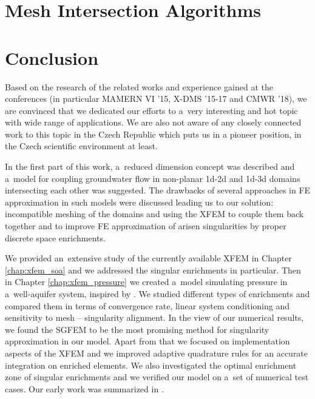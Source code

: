\documentclass[bibliography=totocnumbered,dvipsnames,FM,Dis,EN]{tulthesis}
\begin{document}

\chapter{Mesh Intersection Algorithms} \label{chap:intersections}







\chapter{Conclusion} \label{chap:summary}


Based on the research of the related works and experience gained at the conferences
(in particular MAMERN VI '15, X-DMS '15-17 and CMWR '18),
we are convinced that we dedicated our efforts to a~very interesting and hot topic with wide range of applications.
We are also not aware of any closely connected work to this topic in the Czech Republic
which puts us in a pioneer position, in the Czech scientific environment at least.

In the first part of this work, a~reduced dimension concept was described and a~model for coupling
groundwater flow in non-planar 1d-2d and 1d-3d domains intersecting each other was suggested. 
The drawbacks of several approaches in FE approximation in such models were discussed leading us to
our solution: incompatible meshing of the domains and using the XFEM to couple them back together and to improve
FE approximation of arisen singularities by proper discrete space enrichments.

We provided an~extensive study of the currently available XFEM \cite{fries_xfem_overview_2010, babuska_stable_2012} in Chapter \ref{chap:xfem_soa}
and we addressed the singular enrichments in particular. 
Then in Chapter \ref{chap:xfem_pressure} we created a~model simulating pressure in a~well-aquifer system, inspired by \cite{gracie_modelling_2010, craig_using_2011}.
We studied different types of enrichments and compared them in terms of
convergence rate, linear system conditioning and sensitivity to mesh -- singularity alignment.
In the view of our numerical results, we found the SGFEM to be the most promising method
for singularity approximation in our model.
Apart from that we focused on implementation aspects of the XFEM and we improved adaptive quadrature rules
for an accurate integration on enriched elements. We also investigated the optimal enrichment zone
of singular enrichments and we verified our model on a~set of numerical test cases.
Our early work was summarized in \cite{exner_2016}.
\end{document}
